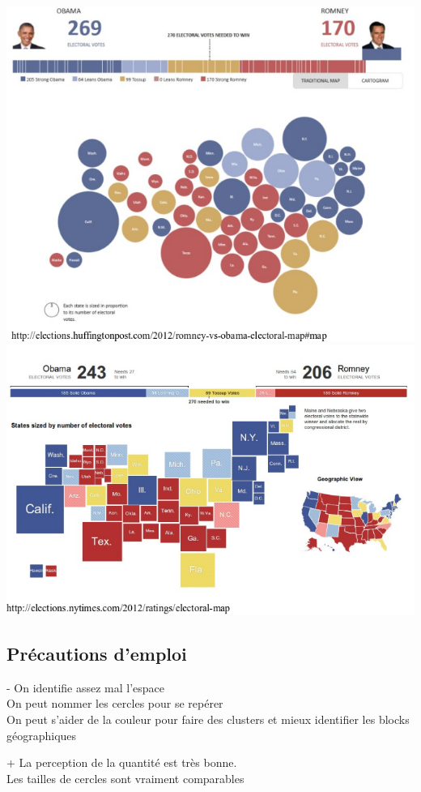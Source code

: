 \documentclass[]{book}
\begin{document}
\includegraphics{img/dorling2.png}
\includegraphics{img/dorling3.png}

\hypertarget{precautions-demploi}{%
\subsection{Précautions d'emploi}\label{precautions-demploi}}

- On identifie assez mal l'espace\\
On peut nommer les cercles pour se repérer\\
On peut s'aider de la couleur pour faire des clusters et mieux identifier les blocks géographiques

+ La perception de la quantité est très bonne.\\
Les tailles de cercles sont vraiment comparables
\end{document}
